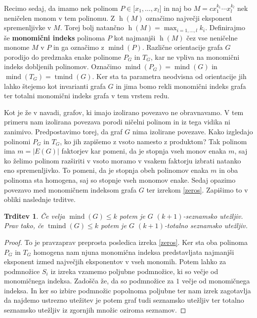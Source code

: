 \documentclass[12pt,a4paper,twoside]{article}
\theoremstyle{definition} %
\theoremstyle{plain} %
\newtheorem{trditev}[definicija]{Trditev}
\numberwithin{equation}{section}  %
\DeclareMathOperator{\mind}{mind}
\DeclareMathOperator{\tmind}{tmind}
\DeclareMathOperator{\h}{h}
\begin{document}
Recimo sedaj, da imamo nek polinom $ P \in \mathbb[x_1, \ldots, x_l]$ in naj bo $M = cx_1^{k_1} \cdots x_l^{k_l}$ nek neničelen monom v tem polinomu. Z $\h(M)$ označimo največji eksponent spremenljivke v $M$. Torej bolj natančno $\h(M) = \max_{i = 1, \ldots, l} k_i$. Definirajmo še \textbf{monomični indeks} polinoma $P$ kot najmanjši $\h(M)$ čez vse neničelne monome $M$ v $P$ in ga označimo z \textbf{$\mind(P)$}. Različne orientacije grafa $G$ porodijo do predznaka enake polinome $P_G$ in $T_G$, kar ne vpliva na monomični indeks dobljenih polinomov. Označimo $\mind(P_G) = \mind(G)$ in $\mind(T_G) = \tmind(G)$. Ker sta ta parametra neodvisna od orientacije jih lahko štejemo kot invarianti grafa $G$ in jima bomo rekli monomični indeks grafa ter totalni monomični indeks grafa v tem vrstem redu. 

Kot je že v navadi, grafov, ki imajo izolirano povezavo ne obravnavamo. V tem primeru nam izolirana povezava porodi ničelni polinom in iz tega vidika ni zanimivo. Predpostavimo torej, da graf $G$ nima izolirane povezave. Kako izgledajo polinomi $P_G$ in $T_G$, ko jih zapišemo z vsoto namesto z produktom? Tak polinom ima $m = |E(G)|$ faktorjev kar pomeni, da je stopnja vseh monov enaka $m$, saj ko želimo polinom razširiti v vsoto moramo v vsakem faktorju izbrati natanko eno spremenljivko. To pomeni, da je stopnja obeh polinomov enaka $m$ in oba polinoma sta homogena, saj so stopnje vseh monomov enake. Sedaj opazimo povezavo med monomičnem indeksom grafa $G$ ter izrekom \ref{zeros}. Zapišimo to v obliki naslednje trditve.
\begin{trditev}
Če velja $\mind(G) \le k$ potem je $G$ $(k+1)$-seznamsko utežljiv. Prav tako, če $\tmind(G) \le k$ potem je $G$ $(k+1)$-totalno seznamsko utežljiv.
\end{trditev}

\begin{proof}
To je pravzaprav preprosta posledica izreka \ref{zeros}. Ker sta oba polinoma $P_G$ in $T_G$ homogena nam njuna monomična indeksa predstavljata najmanjši eksponent izmed največjih eksponentov v vseh monomih. Potem lahko za podmnožice $S_i$ iz izreka vzamemo poljubne podmnožice, ki so večje od monomičnega indeksa. Zadošča že, da so podmnožice za $1$ večje od monomičnega indeksa. In ker so izbire podmnožic popolnoma poljubne ter nam izrek zagotavlja da najdemo ustrezno utežitev je potem graf tudi seznamsko utežljiv ter totalno seznamsko utežljiv iz zgornjih množic oziroma seznamov.
\end{proof}
\end{document}
